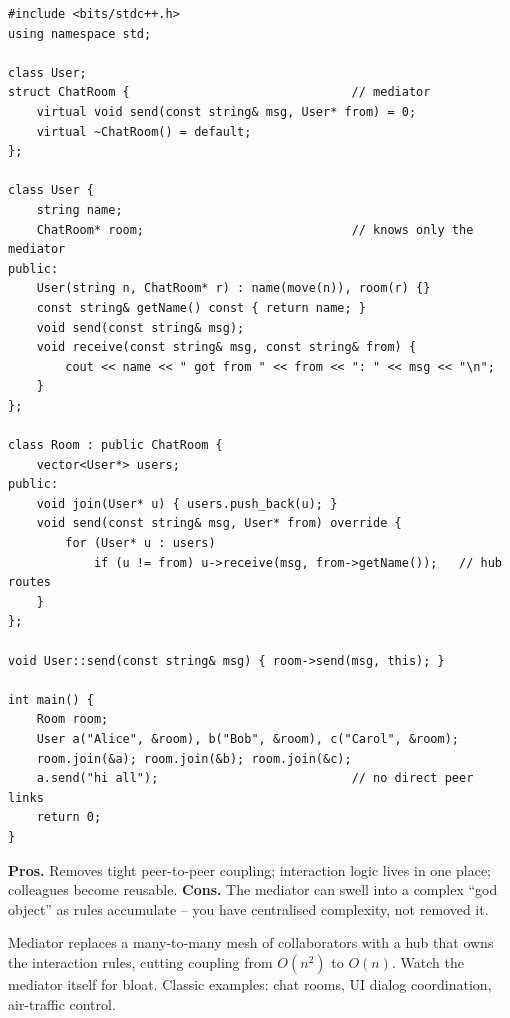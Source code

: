\begin{lstlisting}
#include <bits/stdc++.h>
using namespace std;

class User;
struct ChatRoom {                               // mediator
    virtual void send(const string& msg, User* from) = 0;
    virtual ~ChatRoom() = default;
};

class User {
    string name;
    ChatRoom* room;                             // knows only the mediator
public:
    User(string n, ChatRoom* r) : name(move(n)), room(r) {}
    const string& getName() const { return name; }
    void send(const string& msg);
    void receive(const string& msg, const string& from) {
        cout << name << " got from " << from << ": " << msg << "\n";
    }
};

class Room : public ChatRoom {
    vector<User*> users;
public:
    void join(User* u) { users.push_back(u); }
    void send(const string& msg, User* from) override {
        for (User* u : users)
            if (u != from) u->receive(msg, from->getName());   // hub routes
    }
};

void User::send(const string& msg) { room->send(msg, this); }

int main() {
    Room room;
    User a("Alice", &room), b("Bob", &room), c("Carol", &room);
    room.join(&a); room.join(&b); room.join(&c);
    a.send("hi all");                           // no direct peer links
    return 0;
}
\end{lstlisting}

\begin{complexitybox}
\textbf{Pros.} Removes tight peer-to-peer coupling; interaction logic
lives in one place; colleagues become reusable. \textbf{Cons.} The
mediator can swell into a complex ``god object'' as rules accumulate --
you have centralised complexity, not removed it.
\end{complexitybox}

\begin{takeawaybox}
Mediator replaces a many-to-many mesh of collaborators with a hub that
owns the interaction rules, cutting coupling from $O(n^2)$ to $O(n)$.
Watch the mediator itself for bloat. Classic examples: chat rooms, UI
dialog coordination, air-traffic control.
\end{takeawaybox}
